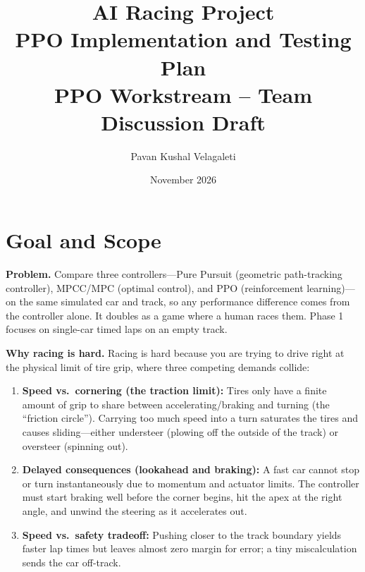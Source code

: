 \documentclass[11pt]{article}
\title{\textbf{AI Racing Project}\\ \large PPO Implementation and Testing Plan\\ \normalsize PPO Workstream -- Team Discussion Draft}
\author{Pavan Kushal Velagaleti}
\date{November 2026}
\begin{document}
\maketitle

\section{Goal and Scope}
\noindent\textbf{Problem.}
Compare three controllers---Pure Pursuit (geometric path-tracking controller), MPCC/MPC (optimal control), and PPO (reinforcement learning)---on the same simulated car and track, so any performance difference comes from the controller alone. It doubles as a game where a human races them. Phase 1 focuses on single-car timed laps on an empty track.

\vspace{0.5em}
\noindent\textbf{Why racing is hard.}
Racing is hard because you are trying to drive right at the physical limit of tire grip, where three competing demands collide:
\begin{enumerate}[leftmargin=1.5em, itemsep=0.25em]
    \item \textbf{Speed vs.\ cornering (the traction limit):} Tires only have a finite amount of grip to share between accelerating/braking and turning (the ``friction circle''). Carrying too much speed into a turn saturates the tires and causes sliding---either understeer (plowing off the outside of the track) or oversteer (spinning out).
    \item \textbf{Delayed consequences (lookahead and braking):} A fast car cannot stop or turn instantaneously due to momentum and actuator limits. The controller must start braking well before the corner begins, hit the apex at the right angle, and unwind the steering as it accelerates out.
    \item \textbf{Speed vs.\ safety tradeoff:} Pushing closer to the track boundary yields faster lap times but leaves almost zero margin for error; a tiny miscalculation sends the car off-track.
\end{enumerate}
\end{document}
